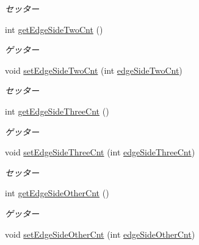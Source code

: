 \begin{DoxyCompactItemize}
\begin{DoxyCompactList}\small\item\em セッター \end{DoxyCompactList}\item 
int \hyperlink{classjp_1_1gr_1_1java__conf_1_1yuta__yoshinaga_1_1reversi_1_1model_1_1_reversi_anz_a8dfaff66ad4ffa6fc17686b444640133}{get\+Edge\+Side\+Two\+Cnt} ()
\begin{DoxyCompactList}\small\item\em ゲッター \end{DoxyCompactList}\item 
void \hyperlink{classjp_1_1gr_1_1java__conf_1_1yuta__yoshinaga_1_1reversi_1_1model_1_1_reversi_anz_ae08ab4f24718ec5f1f84bd0f26da41fd}{set\+Edge\+Side\+Two\+Cnt} (int \hyperlink{classjp_1_1gr_1_1java__conf_1_1yuta__yoshinaga_1_1reversi_1_1model_1_1_reversi_anz_a447d2e49b153291630120d1d427ae3db}{edge\+Side\+Two\+Cnt})
\begin{DoxyCompactList}\small\item\em セッター \end{DoxyCompactList}\item 
int \hyperlink{classjp_1_1gr_1_1java__conf_1_1yuta__yoshinaga_1_1reversi_1_1model_1_1_reversi_anz_aac7599a6088a6f55f8c35d1b66efd533}{get\+Edge\+Side\+Three\+Cnt} ()
\begin{DoxyCompactList}\small\item\em ゲッター \end{DoxyCompactList}\item 
void \hyperlink{classjp_1_1gr_1_1java__conf_1_1yuta__yoshinaga_1_1reversi_1_1model_1_1_reversi_anz_afb1fe81327e740d133aa623902cacab0}{set\+Edge\+Side\+Three\+Cnt} (int \hyperlink{classjp_1_1gr_1_1java__conf_1_1yuta__yoshinaga_1_1reversi_1_1model_1_1_reversi_anz_ab02143be6b8a44b40c67466b8ac73b4f}{edge\+Side\+Three\+Cnt})
\begin{DoxyCompactList}\small\item\em セッター \end{DoxyCompactList}\item 
int \hyperlink{classjp_1_1gr_1_1java__conf_1_1yuta__yoshinaga_1_1reversi_1_1model_1_1_reversi_anz_a9025139254f03724b4ec7fca9975da83}{get\+Edge\+Side\+Other\+Cnt} ()
\begin{DoxyCompactList}\small\item\em ゲッター \end{DoxyCompactList}\item 
void \hyperlink{classjp_1_1gr_1_1java__conf_1_1yuta__yoshinaga_1_1reversi_1_1model_1_1_reversi_anz_a00da6644a1ea7ef66e51eb08a4fa8177}{set\+Edge\+Side\+Other\+Cnt} (int \hyperlink{classjp_1_1gr_1_1java__conf_1_1yuta__yoshinaga_1_1reversi_1_1model_1_1_reversi_anz_aaf35a0f45aedefdac9c572bd06027e03}{edge\+Side\+Other\+Cnt})

\end{DoxyCompactItemize}
